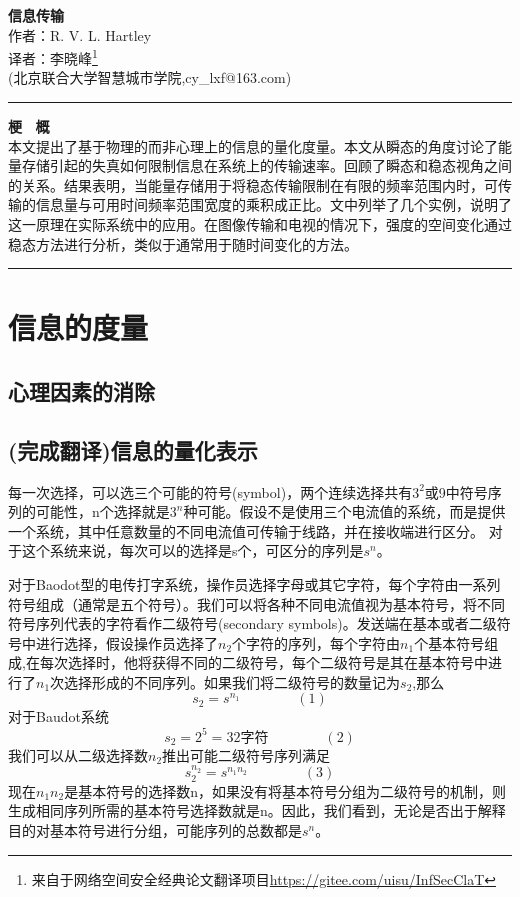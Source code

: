 \documentclass{hfutpaper}
\begin{document}
\begin{center}
\LARGE
  \textbf{信息传输}\\
  \vspace{0.2em}
  \large
    作者：R. V. L. Hartley \\
    
  {\small 译者：李晓峰}\footnote{来自于网络空间安全经典论文翻译项目\url{https://gitee.com/uisu/InfSecClaT}}\\
  {\small (北京联合大学智慧城市学院,cy\_lxf@163.com)}\\
  
  \end{center}
\rule[0.1\baselineskip]{\textwidth}{0.5pt}
\textbf{梗 \ 概}\\
\large
本文提出了基于物理的而非心理上的信息的量化度量。本文从瞬态的角度讨论了能量存储引起的失真如何限制信息在系统上的传输速率。回顾了瞬态和稳态视角之间的关系。结果表明，当能量存储用于将稳态传输限制在有限的频率范围内时，可传输的信息量与可用时间频率范围宽度的乘积成正比。文中列举了几个实例，说明了这一原理在实际系统中的应用。在图像传输和电视的情况下，强度的空间变化通过稳态方法进行分析，类似于通常用于随时间变化的方法。
\\
\rule[0.1\baselineskip]{\textwidth}{0.5pt}


\section{信息的度量}

\subsection{心理因素的消除}

\subsection{(完成翻译)信息的量化表示}
每一次选择，可以选三个可能的符号(symbol)，两个连续选择共有$3^2$或9中符号序列的可能性，n个选择就是$3^n$种可能。假设不是使用三个电流值的系统，而是提供一个系统，其中任意数量的不同电流值可传输于线路，并在接收端进行区分。
对于这个系统来说，每次可以的选择是s个，可区分的序列是$s^n$。
\par

对于Baodot型的电传打字系统，操作员选择字母或其它字符，每个字符由一系列符号组成（通常是五个符号）。我们可以将各种不同电流值视为基本符号，将不同符号序列代表的字符看作二级符号(secondary symbols)。发送端在基本或者二级符号中进行选择，假设操作员选择了$n_2$个字符的序列，每个字符由$n_1$个基本符号组成,在每次选择时，他将获得不同的二级符号，每个二级符号是其在基本符号中进行了$n_1$次选择形成的不同序列。如果我们将二级符号的数量记为$s_2$,那么
\[s_2=s^{n_1} \qquad \qquad (1)\]
对于Baudot系统
\[s_2=2^5=32 \text{字符} \qquad \qquad (2)\]
我们可以从二级选择数$n_2$推出可能二级符号序列满足
\[s_2^{n_2} = s^{n_1 n_2} \qquad \qquad (3) \]
现在$n_1 n_2$是基本符号的选择数n，如果没有将基本符号分组为二级符号的机制，则生成相同序列所需的基本符号选择数就是n。因此，我们看到，无论是否出于解释目的对基本符号进行分组，可能序列的总数都是$s^n$。
\end{document}
